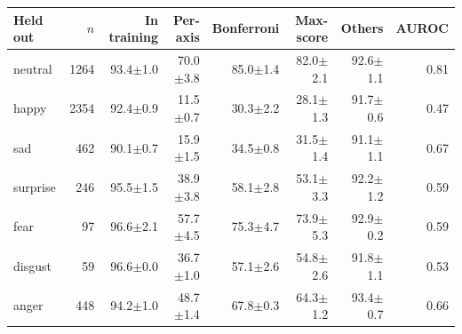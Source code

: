 \begin{tabular}{lrrrrrrr}
\toprule
Held out & $n$ & In training & Per-axis & Bonferroni & Max-score & Others & AUROC \\
\midrule
neutral & 1264 & 93.4$\pm$1.0 & 70.0$\pm$3.8 & 85.0$\pm$1.4 & 82.0$\pm$2.1 & 92.6$\pm$1.1 & 0.81 \\
happy & 2354 & 92.4$\pm$0.9 & 11.5$\pm$0.7 & 30.3$\pm$2.2 & 28.1$\pm$1.3 & 91.7$\pm$0.6 & 0.47 \\
sad & 462 & 90.1$\pm$0.7 & 15.9$\pm$1.5 & 34.5$\pm$0.8 & 31.5$\pm$1.4 & 91.1$\pm$1.1 & 0.67 \\
surprise & 246 & 95.5$\pm$1.5 & 38.9$\pm$3.8 & 58.1$\pm$2.8 & 53.1$\pm$3.3 & 92.2$\pm$1.2 & 0.59 \\
fear & 97 & 96.6$\pm$2.1 & 57.7$\pm$4.5 & 75.3$\pm$4.7 & 73.9$\pm$5.3 & 92.9$\pm$0.2 & 0.59 \\
disgust & 59 & 96.6$\pm$0.0 & 36.7$\pm$1.0 & 57.1$\pm$2.6 & 54.8$\pm$2.6 & 91.8$\pm$1.1 & 0.53 \\
anger & 448 & 94.2$\pm$1.0 & 48.7$\pm$1.4 & 67.8$\pm$0.3 & 64.3$\pm$1.2 & 93.4$\pm$0.7 & 0.66 \\
\bottomrule
\end{tabular}
